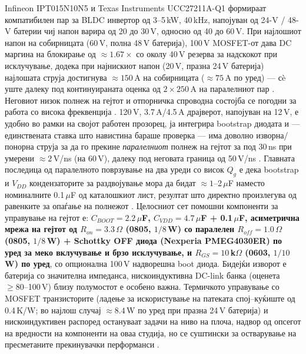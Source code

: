 \documentclass[11pt,a4paper]{article}
\newcommand{\eng}[1]{\textenglish{#1}}
\begin{document}
Infineon IPT015N10N5 и Texas Instruments UCC27211A-Q1 формираат компатибилен пар за BLDC инвертор од 3--5\,kW, 40\,kHz, напојуван од 24-V / 48-V батерии чиј напон варира од 20 до 30\,V, односно од 40 до 60\,V. При најлошиот напон на собирницата (60\,V, полна 48\,V батерија), 100\,V MOSFET-от дава DC маргина на блокирање од $\approx 1.67\times$ со околу 40\,V резерва за надскокот при исклучување, додека при најнискиот напон (20\,V, празна 24\,V батерија) најлошата струја достигнува $\approx 150$\,A на собирницата ($\approx 75$\,A по уред) --- сè уште далеку под континуираната оценка од $2\times 250$\,A на паралелниот пар \cite{ref1}. Неговиот низок полнеж на гејтот и отпорничка спроводна состојба се погодни за работа со висока фреквенција \cite{ref1}. 120\,V, 3.7\,A/4.5\,A драјверот, напојуван на 12\,V, е удобно во рамки на својот работен прозорец, ја интегрира \eng{bootstrap} диодата и --- единствената ставка што навистина бараше проверка --- има доволно изворна/понорна струја за да го прекине \emph{паралелниот} полнеж на гејтот за под 30\,ns при умерени $\approx 2$\,V/ns (на 60\,V), далеку под неговата граница од 50\,V/ns \cite{ref3}. Главната последица од паралелното поврзување на два уреди со висок $Q_g$ е дека \eng{bootstrap} и $V_{DD}$ кондензаторите за раздвојување мора да бидат $\approx 1$--2\,$\mu$F наместо номиналните 0.1\,$\mu$F од каталошкиот лист, резултат што директно произлегува од равенките за опаѓање на полнежот \cite{ref3,ref6,ref7}. Целосниот сет помошни компоненти за управување на гејтот е: \textbf{$C_{BOOT}=2.2\,\mu$F, $C_{VDD}=4.7\,\mu$F + 0.1\,$\mu$F, асиметрична мрежа на гејтот од $R_{on}=3.3\,\Omega$ (0805, $1/8$\,W) со паралелен $R_{off}=1.0\,\Omega$ (0805, $1/8$\,W) + \eng{Schottky} OFF диода (Nexperia PMEG4030ER) по уред за меко вклучување и брзо исклучување, и $R_{GS}=10$\,k$\Omega$ (0603, $1/10$\,W) по уред}, со опционална 100\,V надворешна \eng{boot} диода. Бидејќи изворот е батерија со значителна импеданса, нискоиндуктивна \eng{DC-link} банка (оценета $\ge 80$--100\,V) близу полумостот е особено важна. Термичкото управување со MOSFET транзисторите (ладење за искористување на патеката спој--куќиште од 0.4\,K/W; во најлош случај $\approx 8.4$\,W по уред при празна 24\,V батерија) и нискоиндуктивен распоред остануваат задачи на ниво на плоча, надвор од опсегот на вредности на компоненти на оваа студија, но се суштински за остварување на пресметаните прекинувачки перформанси \cite{ref1,ref3}.
\end{document}
